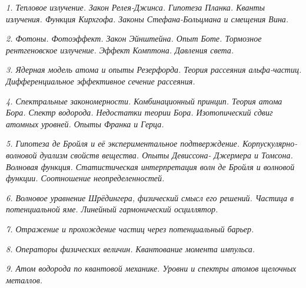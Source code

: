 




\emph{1. Тепловое излучение. Закон Релея-Джинса. Гипотеза Планка. 
Кванты излучения. Функция Кирхгофа. Законы Стефана-Больцмана и 
смещения Вина.}

\newpage %

\emph{2. Фотоны. Фотоэффект. Закон Эйнштейна. Опыт Боте. Тормозное 
рентгеновское излучение. Эффект Комптона. Давления света.}

\newpage %

\emph{3. Ядерная модель атома и опыты Резерфорда. Теория рассеяния 
альфа-частиц. Дифференциальное эффективное сечение рассеяния.}

\newpage %

\emph{4. Спектральные закономерности. Комбинационный принцип. Теория 
атома Бора. Спектр водорода. Недостатки теории Бора. Изотопический 
сдвиг атомных уровней. Опыты Франка и Герца.}

\newpage %

\emph{5. Гипотеза де Бройля и её экспериментальное подтверждение. 
Корпускулярно-волновой дуализм свойств вещества. Опыты Девиссона-
Джермера и Томсона. Волновая функция. Статистическая интерпретация 
волн де Бройля и волновой функции. Соотношение неопределенностей.}

\newpage %

\emph{6. Волновое уравнение Шрёдингера, физический смысл его решений. 
Частица в потенциальной яме. Линейный гармонический осциллятор.}

\newpage %

\emph{7. Отражение и прохождение частиц через потенциальный барьер.}

\newpage %

\emph{8. Операторы физических величин. Квантование момента импульса.}

\newpage %

\emph{9. Атом водорода по квантовой механике. Уровни и спектры атомов 
щелочных металлов.}


